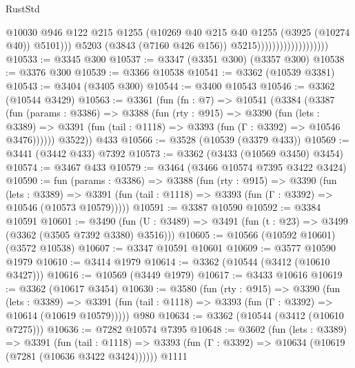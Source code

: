 \begin{lexlean}{RustStd}
\begin{coremodule}
                                              @10030
                                              @946
                                              @122
                                              @215
                                              @1255
                                              (@10269
                                                @40
                                                @215
                                                @40
                                                @1255
                                                (@3925 (@10274 @40))
                                                @5101)))
                                          @5203
                                          (@3843 (@7160 @426 @156))
                                          @5215)))))))))))))))))))
@10533 := @3345 @300
@10537 := @3347 (@3351 @300) (@3357 @300)
@10538 := @3376 @300
@10539 := @3366 @10538
@10541 := @3362 (@10539 @3381)
@10543 := @3404 (@3405 @300)
@10544 := @3400 @10543
@10546 := @3362 (@10544 @3429)
@10563 := @3361
    (fun (fn : @7) =>
    @10541
      (@3384
        (@3387
          (fun (params : @3386) =>
          @3388
            (fun (rty : @915) =>
            @3390
              (fun (lets : @3389) =>
              @3391 (fun (tail : @1118) => @3393 (fun (Γ : @3392) => @10546 @3476))))))
        @3522))
    @433
@10566 := @3528 (@10539 (@3379 @433))
@10569 := @3441 (@3442 @433) @7392
@10573 := @3362 (@3433 (@10569 @3450) @3454)
@10574 := @3467 @433
@10579 := @3464 (@3466 @10574 @7395 @3422 @3424)
@10590 := fun (params : @3386) =>
  @3388
    (fun (rty : @915) =>
    @3390
      (fun (lets : @3389) =>
      @3391 (fun (tail : @1118) => @3393 (fun (Γ : @3392) => @10546 (@10573 @10579)))))
@10591 := @3387 @10590
@10592 := @3384 @10591
@10601 := @3490
    (fun (U : @3489) => @3491 (fun (t : @23) => @3499 (@3362 (@3505 @7392 @3380) @3516)))
@10605 := @10566 (@10592 @10601) (@3572 @10538)
@10607 := @3347 @10591 @10601
@10609 := @3577 @10590 @1979
@10610 := @3414 @1979
@10614 := @3362 (@10544 (@3412 (@10610 @3427)))
@10616 := @10569 (@3449 @1979)
@10617 := @3433 @10616
@10619 := @3362 (@10617 @3454)
@10630 := @3580
    (fun (rty : @915) =>
    @3390
      (fun (lets : @3389) =>
      @3391 (fun (tail : @1118) => @3393 (fun (Γ : @3392) => @10614 (@10619 @10579)))))
    @980
@10634 := @3362 (@10544 (@3412 (@10610 @7275)))
@10636 := @7282 @10574 @7395
@10648 := @3602
    (fun (lets : @3389) =>
    @3391
      (fun (tail : @1118) =>
      @3393 (fun (Γ : @3392) => @10634 (@10619 (@7281 (@10636 @3422 @3424))))))
    @1111

\end{coremodule}
\end{lexlean}
